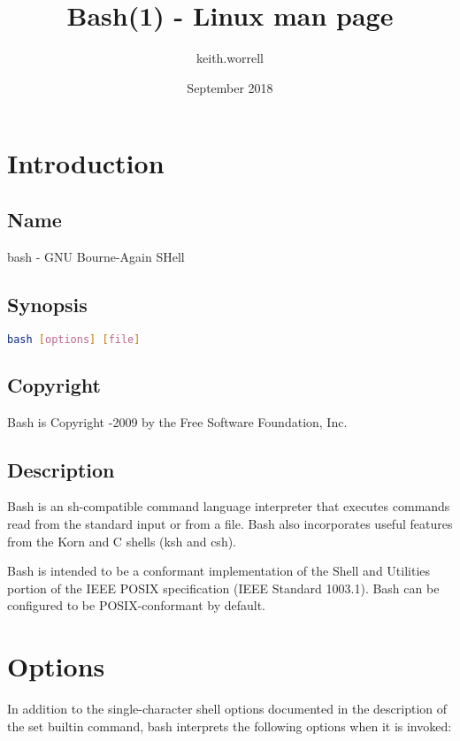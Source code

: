 \documentclass[11pt]{article}
\title{Bash(1) - Linux man page}
\author{keith.worrell}
\date{September 2018}
\begin{document}
\maketitle
\tableofcontents 
\section{Introduction}
\subsection{Name}
bash - GNU Bourne-Again SHell

\subsection{Synopsis}
\label{sec:synopsis}
\noindent
\begin{lstlisting}[language=bash]
  bash [options] [file]
\end{lstlisting}

\subsection{Copyright}
Bash is Copyright -2009 by the Free Software Foundation, Inc.

\subsection{Description}
\label{sec:description}
 
Bash is an sh-compatible command language interpreter that executes commands read from the standard input or from a file. Bash also incorporates useful features from the Korn and C shells (ksh and csh).

Bash is intended to be a conformant implementation of the Shell and Utilities portion of the IEEE POSIX specification (IEEE Standard 1003.1). Bash can be configured to be POSIX-conformant by default.

\section{Options}
\label{sec:options}
In addition to the single-character shell options documented in the description of the set builtin command, bash interprets the following options when it is invoked:

\renewcommand{\arraystretch}{2}

\newcommand{\ttext}[2]{\fontfamily{qcr}\selectfont#1\textit{#2}}
\end{document}
